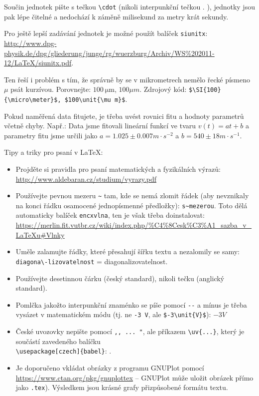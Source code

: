 			Součin jednotek pište s tečkou \verb|\cdot| (nikoli interpunkční tečkou . ), jednotky jsou pak lépe čitelné a nedochází k záměně milisekund za metry krát sekundy. 
			
			Pro ještě lepší zadávání jednotek je možné použít balíček \verb|siunitx|: \url{http://www.dpg-physik.de/dpg/gliederung/junge/rg/wuerzburg/Archiv/WS%202011-12/LaTeX/siunitx.pdf}. 
			
			Ten řeší i problém s tím, že správně by se v mikrometrech nemělo řecké písmeno $\mu$ psát kurzívou. Porovnejte: $\SI{100}{\micro\meter}$, $100\unit{\mu m}$. Zdrojový kód: \verb|$\SI{100}{\micro\meter}$, $100\unit{\mu m}$|.
		
		Pokud naměřená data fitujete, je třeba uvést rovnici fitu a hodnoty parametrů včetně chyby. Např.: Data jsme fitovali lineární funkcí ve tvaru $v(t) = at+b$ a parametry fitu jsme určili jako $a=1.025\pm0.007\unit{m\cdot s^{-2}}$ a $b=540\pm18\unit{m\cdot s^{-1}}$. 
			
Tipy a triky pro psaní v \LaTeX:
			\begin{itemize}
			\item Projděte si pravidla pro psaní matematických a fyzikálních výrazů: 	\url{http://www.aldebaran.cz/studium/vyrazy.pdf}
			\item Používejte pevnou mezeru \verb|~| tam, kde se nemá zlomit řádek (aby nevznikaly na konci řádku osamocené jednopísmenné předložky): \verb|s~mezerou|. 
			Toto dělá automaticky balíček \verb|encxvlna|, ten je však třeba doinstalovat: \url{https://merlin.fit.vutbr.cz/wiki/index.php/%C4%8Cesk%C3%A1_sazba_v_LaTeXu#Vlnky}
			
			\item Uměle zalamujte řádky, které přesahují šířku textu a nezalomily se samy: \verb|diagona\-lizovatelnost| = diagona\-lizovatelnost.

			\item Používejte desetinnou čárku (český standard), nikoli tečku (anglický standard).
			
			\item Pomlčka jakožto interpunkční znaménko se píše pomocí \verb|--| a mínus je třeba vysázet v matematickém módu (tj. ne \verb|-3 V|, ale \verb|$-3\unit{V}$|): $-3\unit{V}$ 
			
			\item České uvozovky nepište pomocí \verb|,, ... "|, ale příkazem \verb|\uv{...}|, který je součástí zavedeného balíčku \\ \verb|\usepackage[czech]{babel}|: .
			
			\item Je doporučeno vkládat obrázky z programu GNUPlot pomocí \url{https://www.ctan.org/pkg/gnuplottex} -- GNUPlot může uložit obrázek přímo jako \texttt{.tex}). Výsledkem jsou krásné grafy přizpůsobené formátu textu.
				\end{itemize}			
			

